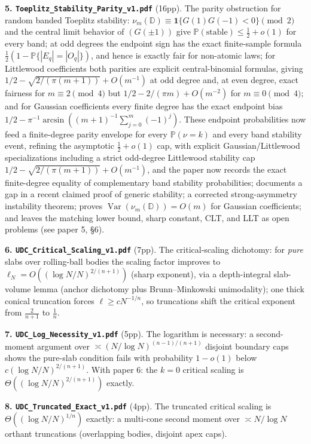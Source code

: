 \documentclass[11pt]{article}
\begin{document}
\textbf{5. \texttt{Toeplitz\_Stability\_Parity\_v1.pdf}} (16pp).
The parity obstruction for random banded Toeplitz stability:
$\nu_m(\mathbb D)\equiv\mathbf 1\{G(1)G(-1)<0\}\pmod 2$ and the central limit
behavior of $(G(\pm1))$ give $\mathbb P(\text{stable})\le\frac12+o(1)$ for
every band; at odd degrees the endpoint sign has the exact finite-sample formula
\(\frac12(1-\mathbb P\{|E_q|=|O_q|\})\), and hence is exactly fair for
non-atomic laws; for Littlewood coefficients both parities are explicit
central-binomial formulas, giving
\(1/2-\sqrt{2/(\pi(m+1))}+O(m^{-1})\) at odd degree and, at even degree, exact
fairness for \(m\equiv2\pmod4\) but
\(1/2-2/(\pi m)+O(m^{-2})\) for \(m\equiv0\pmod4\); and for Gaussian
coefficients every finite degree has the exact endpoint bias
\(1/2-\pi^{-1}\arcsin((m+1)^{-1}\sum_{j=0}^m(-1)^j)\).  These endpoint
probabilities now feed a finite-degree parity envelope for every
\(\mathbb P(\nu=k)\) and every band stability event, refining the asymptotic
\(\frac12+o(1)\) cap, with explicit Gaussian/Littlewood specializations
including a strict odd-degree Littlewood stability cap
\(1/2-\sqrt{2/(\pi(m+1))}+O(m^{-1})\), and the paper now records the exact
finite-degree equality of complementary band stability probabilities;
documents a gap in a recent claimed proof of generic stability; a corrected
strong-asymmetry instability theorem; proves
\(\operatorname{Var}(\nu_m(\mathbb D))=O(m)\) for Gaussian coefficients; and
leaves the matching lower bound, sharp constant, CLT, and LLT as open problems
(see paper 5, \S6).

\textbf{6. \texttt{UDC\_Critical\_Scaling\_v1.pdf}} (7pp).
The critical-scaling dichotomy: for \emph{pure} slabs over rolling-ball bodies
the scaling factor improves to $\ell_N=O((\log N/N)^{2/(n+1)})$ (sharp
exponent), via a depth-integral slab-volume lemma (anchor dichotomy plus
Brunn--Minkowski unimodality); one thick conical truncation forces
$\ell\ge cN^{-1/n}$, so truncations shift the critical exponent from
$\frac{2}{n+1}$ to $\frac1n$.

\textbf{7. \texttt{UDC\_Log\_Necessity\_v1.pdf}} (5pp).
The logarithm is necessary: a second-moment argument over
$\asymp(N/\log N)^{(n-1)/(n+1)}$ disjoint boundary caps shows the pure-slab
condition fails with probability $1-o(1)$ below
$c(\log N/N)^{2/(n+1)}$.  With paper 6: the $k=0$ critical scaling is
$\Theta((\log N/N)^{2/(n+1)})$ exactly.

\textbf{8. \texttt{UDC\_Truncated\_Exact\_v1.pdf}} (4pp).
The truncated critical scaling is $\Theta((\log N/N)^{1/n})$ exactly: a
multi-cone second moment over $\asymp N/\log N$ orthant truncations
(overlapping bodies, disjoint apex caps).
\end{document}
